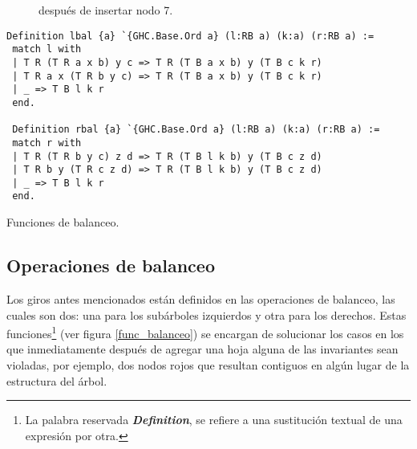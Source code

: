 \begin{figure}[!ht]
\centering
\captionsetup{justification=centering}
\caption{{\Arn} después de insertar nodo 7.}
\label{arbolRB_3}
\end{figure}

\begin{listing}[!ht]
\centering
\captionsetup{justification=centering}
\begin{verbatim}
Definition lbal {a} `{GHC.Base.Ord a} (l:RB a) (k:a) (r:RB a) :=
 match l with
 | T R (T R a x b) y c => T R (T B a x b) y (T B c k r)
 | T R a x (T R b y c) => T R (T B a x b) y (T B c k r)
 | _ => T B l k r
 end.

 Definition rbal {a} `{GHC.Base.Ord a} (l:RB a) (k:a) (r:RB a) :=
 match r with
 | T R (T R b y c) z d => T R (T B l k b) y (T B c z d)
 | T R b y (T R c z d) => T R (T B l k b) y (T B c z d)
 | _ => T B l k r
 end.
\end{verbatim}
\caption{Funciones de balanceo.}
\label{func_balanceo}
\end{listing}

\subsection{Operaciones de balanceo}
Los giros antes mencionados están definidos en las operaciones de balanceo, las cuales son dos: una 
para los subárboles izquierdos y otra para los derechos. Estas funciones\footnote{La palabra reservada \textit{\textbf{Definition}}, se refiere a una sustituci\'on textual de una expresi\'on por otra.\cite{coqdefs}} (ver figura 
\ref{func_balanceo}) se encargan de solucionar los casos en los que inmediatamente después de 
agregar una hoja alguna de las invariantes sean violadas, por ejemplo, dos nodos rojos que resultan 
contiguos en algún lugar de la estructura del \'arbol.

